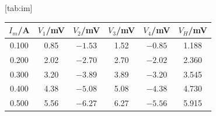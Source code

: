 [tab:im]{
\begin{tabular}{cccccc}
\toprule
$I_m$/A & $V_1$/mV & $V_2$/mV & $V_3$/mV & $V_4$/mV & $V_H$/mV \\
\midrule
0.100 & 0.85 & $-1.53$ & 1.52 & $-0.85$ & 1.188 \\
0.200 & 2.02 & $-2.70$ & 2.70 & $-2.02$ & 2.360 \\
0.300 & 3.20 & $-3.89$ & 3.89 & $-3.20$ & 3.545 \\
0.400 & 4.38 & $-5.08$ & 5.08 & $-4.38$ & 4.730 \\
0.500 & 5.56 & $-6.27$ & 6.27 & $-5.56$ & 5.915 \\
\bottomrule
\end{tabular}}
